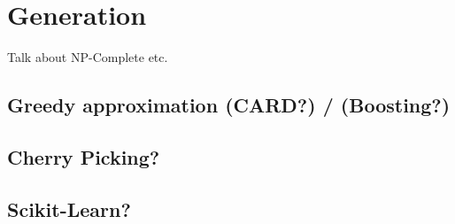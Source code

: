 \section{Generation}
Talk about NP-Complete etc.
\subsection{Greedy approximation (CARD?) / (Boosting?)}
\subsection{Cherry Picking?}
\subsection{Scikit-Learn?}